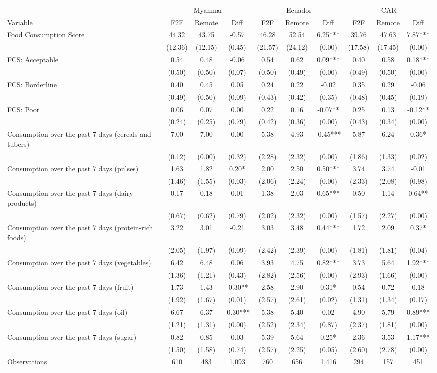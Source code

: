\begin{tabular}{l*{9}c}
\hline\hline
 & \multicolumn{3}{c}{Myanmar} & \multicolumn{3}{c}{Ecuador} & \multicolumn{3}{c}{CAR}\\ 
Variable & F2F & Remote & Diff & F2F & Remote & Diff & F2F & Remote & Diff \\
\hline
Food Consumption Score&44.32&43.75&-0.57&46.28&52.54&6.25***&39.76&47.63&7.87***\\
&(12.36)&(12.15)&(0.45)&(21.57)&(24.12)&(0.00)&(17.58)&(17.45)&(0.00)\\
FCS: Acceptable&0.54&0.48&-0.06&0.54&0.62&0.09***&0.40&0.58&0.18***\\
&(0.50)&(0.50)&(0.07)&(0.50)&(0.49)&(0.00)&(0.49)&(0.50)&(0.00)\\
FCS: Borderline&0.40&0.45&0.05&0.24&0.22&-0.02&0.35&0.29&-0.06\\
&(0.49)&(0.50)&(0.09)&(0.43)&(0.42)&(0.35)&(0.48)&(0.45)&(0.19)\\
FCS: Poor&0.06&0.07&0.00&0.22&0.16&-0.07**&0.25&0.13&-0.12**\\
&(0.24)&(0.25)&(0.79)&(0.42)&(0.36)&(0.00)&(0.43)&(0.34)&(0.00)\\
Consumption over the past 7 days (cereals and tubers)&7.00&7.00&0.00&5.38&4.93&-0.45***&5.87&6.24&0.36*\\
&(0.12)&(0.00)&(0.32)&(2.28)&(2.32)&(0.00)&(1.86)&(1.33)&(0.02)\\
Consumption over the past 7 days (pulses)&1.63&1.82&0.20*&2.00&2.50&0.50***&3.74&3.74&-0.01\\
&(1.46)&(1.55)&(0.03)&(2.06)&(2.24)&(0.00)&(2.33)&(2.08)&(0.98)\\
Consumption over the past 7 days (dairy products)&0.17&0.18&0.01&1.38&2.03&0.65***&0.50&1.14&0.64**\\
&(0.67)&(0.62)&(0.79)&(2.02)&(2.32)&(0.00)&(1.57)&(2.27)&(0.00)\\
Consumption over the past 7 days (protein-rich foods)&3.22&3.01&-0.21&3.03&3.48&0.44***&1.72&2.09&0.37*\\
&(2.05)&(1.97)&(0.09)&(2.42)&(2.39)&(0.00)&(1.81)&(1.81)&(0.04)\\
Consumption over the past 7 days (vegetables)&6.42&6.48&0.06&3.93&4.75&0.82***&3.73&5.64&1.92***\\
&(1.36)&(1.21)&(0.43)&(2.82)&(2.56)&(0.00)&(2.93)&(1.66)&(0.00)\\
Consumption over the past 7 days (fruit)&1.73&1.43&-0.30**&2.58&2.90&0.31*&0.54&0.72&0.18\\
&(1.92)&(1.67)&(0.01)&(2.57)&(2.61)&(0.02)&(1.31)&(1.34)&(0.17)\\
Consumption over the past 7 days (oil)&6.67&6.37&-0.30***&5.38&5.40&0.02&4.90&5.79&0.89***\\
&(1.21)&(1.31)&(0.00)&(2.52)&(2.34)&(0.87)&(2.37)&(1.81)&(0.00)\\
Consumption over the past 7 days (sugar)&0.82&0.85&0.03&5.39&5.64&0.25*&2.36&3.53&1.17***\\
&(1.50)&(1.58)&(0.74)&(2.57)&(2.25)&(0.05)&(2.60)&(2.78)&(0.00)\\
\hline
Observations & 610 & 483 & 1,093 & 760 & 656 & 1,416 & 294 & 157 & 451 \\
\hline\hline
\end{tabular}
